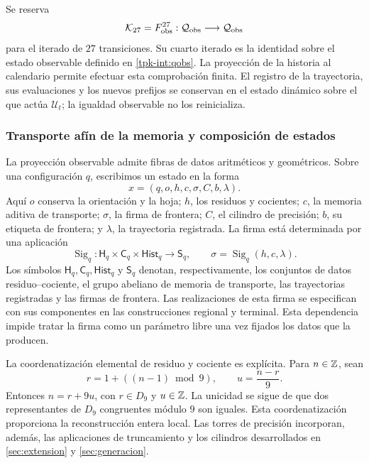 Se reserva
\[
 \mathcal K_{27}=F_{\rm obs}^{27}:
 \mathcal Q_{\rm obs}\longrightarrow\mathcal Q_{\rm obs}
\]
para el iterado de \(27\) transiciones. Su cuarto iterado es la
identidad sobre el estado observable definido en \eqref{tpk-int:qobs}.
La proyección de la historia al calendario permite efectuar esta
comprobación finita. El registro de la trayectoria, sus evaluaciones y
los nuevos prefijos se conservan en el estado dinámico sobre el que
actúa \(\mathcal U_t\); la igualdad observable no los reinicializa.

\subsubsection{Transporte afín de la memoria y composición de estados}
\label{tpk-int:memoria}

La proyección observable admite fibras de datos aritméticos y geométricos.
Sobre una configuración \(q\), escribimos un estado en la forma
\[
 x=(q,o,h,c,\sigma,C,b,\lambda).
\]
Aquí \(o\) conserva la orientación y la hoja; \(h\), los residuos
y cocientes; \(c\), la memoria aditiva de transporte; \(\sigma\),
la firma de frontera; \(C\), el cilindro de precisión; \(b\), su
etiqueta de frontera; y \(\lambda\), la trayectoria registrada. La
firma está determinada por una aplicación
\[
 \operatorname{Sig}_q:
 \mathsf H_q\times\mathsf C_q\times\mathsf{Hist}_q
 \longrightarrow\mathsf S_q,
 \qquad \sigma=\operatorname{Sig}_q(h,c,\lambda).
\]
Los símbolos \(\mathsf H_q,\mathsf C_q,\mathsf{Hist}_q\) y
\(\mathsf S_q\) denotan, respectivamente, los conjuntos de datos
residuo--cociente, el grupo abeliano de memoria de transporte, las
trayectorias registradas y las firmas de frontera.
Las realizaciones de esta firma se especifican con sus componentes en
las construcciones regional y terminal. Esta dependencia impide tratar
la firma como un parámetro libre una vez fijados los datos que la producen.

La coordenatización elemental de residuo y cociente es explícita. Para
\(n\in\mathbb Z\), sean
\[
 r=1+((n-1)\bmod9),\qquad u=\frac{n-r}{9}.
\]
Entonces \(n=r+9u\), con \(r\in D_9\) y \(u\in\mathbb Z\).
La unicidad se sigue de que dos representantes de \(D_9\) congruentes
módulo \(9\) son iguales. Esta coordenatización proporciona la reconstrucción
entera local. Las torres de precisión incorporan, además, las aplicaciones
de truncamiento y los cilindros desarrollados en
\ref{sec:extension} y \ref{sec:generacion}.


